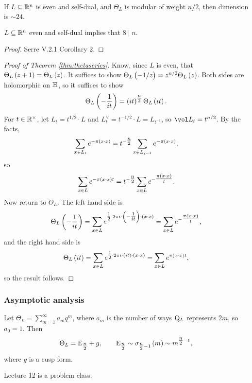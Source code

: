 If $ L \subseteq \mathbb{R}^n $ is even and self-dual, and $ \Theta_L $ is modular of weight $ n / 2 $, then dimension is $ \sim 24 $.

\begin{fact*}
$ L \subseteq \mathbb{R}^n $ even and self-dual implies that $ 8 \mid n $.
\end{fact*}

\begin{proof}
Serre V.2.1 Corollary 2.
\end{proof}

\pagebreak

\begin{proof}[Proof of Theorem \ref{thm:thetaseries}]
Know, since $ L $ is even, that $ \Theta_L\br{z + 1} = \Theta_L\br{z} $. It suffices to show $ \Theta_L\br{-1 / z} = z^{n / 2}\Theta_L\br{z} $. Both sides are holomorphic on $ \mathbb{H} $, so it suffices to show
$$ \Theta_L\br{-\dfrac{1}{it}} = \br{it}^{\tfrac{n}{2}}\Theta_L\br{it}. $$
For $ t \in \mathbb{R}^\times $, let $ L_t = t^{1 / 2} \cdot L $ and $ L_t^\vee = t^{-1 / 2} \cdot L = L_{t^{-1}} $, so $ \vol L_t = t^{n / 2} $. By the facts,
$$ \sum_{x \in L_t} e^{-\pi\br{x \cdot x}} = t^{-\tfrac{n}{2}}\sum_{x \in L_{t^{-1}}} e^{-\pi\br{x \cdot x}}, $$
so
$$ \sum_{x \in L} e^{-\pi\br{x \cdot x}t} = t^{-\tfrac{n}{2}}\sum_{x \in L} e^{-\tfrac{\pi\br{x \cdot x}}{t}}. $$
Now return to $ \Theta_L $. The left hand side is
$$ \Theta_L\br{-\dfrac{1}{it}} = \sum_{x \in L} e^{\tfrac{1}{2} \cdot 2\pi i \cdot \br{-\tfrac{1}{it}} \cdot \br{x \cdot x}} = \sum_{x \in L} e^{-\tfrac{\pi\br{x \cdot x}}{t}}, $$
and the right hand side is
$$ \Theta_L\br{it} = \sum_{x \in L} e^{\tfrac{1}{2} \cdot 2\pi i \cdot \br{it} \cdot \br{x \cdot x}} = \sum_{x \in L} e^{\pi\br{x \cdot x}t}, $$
so the result follows.
\end{proof}

\subsubsection{Asymptotic analysis}

Let $ \Theta_L = \sum_{m = 1}^\infty a_mq^m $, where $ a_m $ is the number of ways $ \mathrm{Q}_L $ represents $ 2m $, so $ a_0 = 1 $. Then
$$ \Theta_L = \E_{\tfrac{n}{2}} + g, \qquad \E_{\tfrac{n}{2}} \sim \sigma_{\tfrac{n}{2} - 1}\br{m} \sim m^{\tfrac{n}{2} - 1}, $$
where $ g $ is a cusp form.


Lecture 12 is a problem class.


